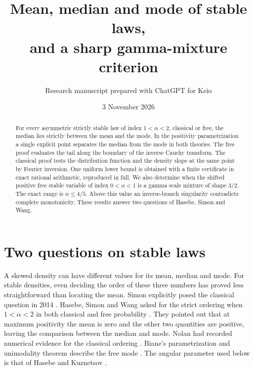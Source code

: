 \documentclass[11pt,a4paper]{article}
\title{Mean, median and mode of stable laws,\\
and a sharp gamma-mixture criterion}
\author{Research manuscript prepared with ChatGPT for Keio}
\date{3 November 2026}
\numberwithin{equation}{section}
\begin{document}
\maketitle
\begin{abstract}
For every asymmetric strictly stable law of index $1<\alpha<2$, classical
or free, the median lies strictly between the mean and the mode.
In the positivity parametrization a single explicit point separates
the median from the mode in both theories. The free proof evaluates
the tail along the boundary of the inverse Cauchy transform.
The classical proof tests the distribution function and the density slope
at the same point by Fourier inversion. One uniform lower bound is obtained
with a finite certificate in exact rational arithmetic, reproduced in full.
We also determine when the shifted positive free stable variable of index
$0<\alpha<1$ is a gamma scale mixture of shape $3/2$. The exact range is
$\alpha\le4/5$. Above this value an inverse-branch singularity contradicts
complete monotonicity. These results answer two questions of Hasebe, Simon
and Wang.
\end{abstract}

\section{Two questions on stable laws}
\label{sec:intro}
A skewed density can have different values for its mean, median and
mode. For stable densities, even deciding the order of these three
numbers has proved less straightforward than locating the mean.
Simon explicitly posed the classical question in 2014 \cite[Remark~12(b)]{Frechet}. Hasebe, Simon and Wang asked for the strict ordering when
$1<\alpha<2$ in both classical and free probability
\cite[Remark~14(b), p.~322]{HSW}. They pointed out that at maximum
positivity the mean is zero and the other two quantities are positive,
leaving the comparison between the median and mode. Nolan had
recorded numerical evidence for the classical ordering
\cite[Chapter~1, p.~14]{Nolan}. Biane's parametrization and unimodality
theorem describe the free mode \cite[Appendix]{BP}. The angular
parameter used below is that of Hasebe and Kuznetsov \cite{HK}.
\end{document}
